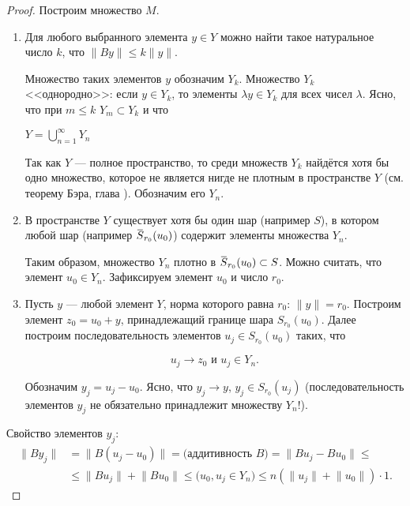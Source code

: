 \documentclass[12pt,a4paper,titlepage,oneside]{book}
\newcommand{\overbar}[1]{\mkern 1.5mu\overline{\mkern-1.5mu#1\mkern-1.5mu}\mkern 1.5mu}
\theoremstyle{definition}
\theoremstyle{plain}
\theoremstyle{break}
\theoremstyle{remark}
\theoremstyle{remark}
\theoremstyle{remark}
\theoremstyle{remark}
\theoremstyle{plain}
\theoremstyle{plain}
\begin{document}
\begin{proof}
Построим множество $M$.

\begin{enumerate}
	\item Для любого выбранного элемента $y \in Y$ можно найти такое натуральное число $k$, что $\lVert By\rVert \leqslant k\lVert y\rVert$.
	
	Множество таких элементов $y$ обозначим $Y_k$. Множество $Y_k$ <<однородно>>: если $y \in Y_k$, то элементы $\lambda y \in Y_k$ для всех чисел $\lambda$. Ясно, что при $m \leqslant k$ $Y_m \subset Y_k$ и что

\begin{center}	

	$Y=\bigcup\limits_{n=1}^\infty Y_n$
	
\end{center}
	
	Так как $Y$ --- полное пространство, то среди множеств $Y_k$ найдётся хотя бы одно множество, которое не является нигде не плотным в пространстве $Y$ (см. теорему Бэра, глава \uppercase\expandafter{}). Обозначим его $Y_n$.
	
	\item В пространстве $Y$ существует хотя бы один шар (например $S$), в котором любой шар (например $\overbar{S}_{r_0}(u_0)$) содержит элементы множества $Y_n$.
	
	Таким образом, множество $Y_n$ плотно в $\overbar{S}_{r_0}(u_0)\subset S$. Можно считать, что элемент $u_0 \in Y_n$. Зафиксируем элемент $u_0$ и число $r_0$.
	
	\item Пусть $y$ --- любой элемент $Y$, норма которого равна $r_0$: $\lVert y\rVert=r_0$. Построим элемент $z_0=u_0+y$, принадлежащий границе шара $S_{r_0}(u_0)$. Далее построим последовательность элементов $u_j \in S_{r_0}(u_0)$ таких, что

$$u_j \to z_0 \mbox{ и } u_j \in Y_n.$$

Обозначим $y_j=u_j-u_0$. Ясно, что $y_j \to y$, $y_j \in S_{r_0}(u_j)$ (последовательность элементов $y_j$ не обязательно принадлежит множеству $Y_n$!).	
\end{enumerate}

Свойство элементов $y_j$:
\begin{align*}
\lVert By_j\rVert &= \lVert B(u_j - u_0)\rVert = \mbox{(аддитивность $B$)} = \lVert Bu_j - Bu_0 \rVert \leqslant\\
&\leqslant \lVert Bu_j\rVert + \lVert Bu_0 \rVert \leqslant \mbox{($u_0, u_j \in Y_n$)} \leqslant n(\lVert u_j\rVert + \lVert u_0\rVert)\cdot 1.
\end{align*}


\end{proof}
\end{document}
